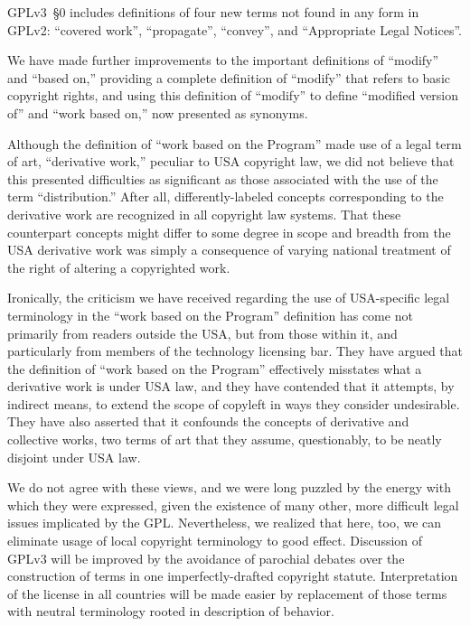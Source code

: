 
GPLv3~\S0 includes definitions of four new terms not found in any form in
GPLv2: ``covered work'', ``propagate'', ``convey'', and ``Appropriate Legal
Notices''.


We have made further improvements to the important definitions of ``modify''
and ``based on,'' providing a complete definition of ``modify'' that refers
to basic copyright rights, and using this definition of ``modify'' to define
``modified version of'' and ``work based on,'' now presented as synonyms.


Although the definition of ``work based on the Program'' made use of a legal
term of art, ``derivative work,'' peculiar to USA copyright law, we did not
believe that this presented difficulties as significant as those associated
with the use of the term ``distribution.''  After all, differently-labeled
concepts corresponding to the derivative work are recognized in all copyright
law systems.  That these counterpart concepts might differ to some degree in
scope and breadth from the USA derivative work was simply a consequence of
varying national treatment of the right of altering a copyrighted work.


Ironically, the criticism we have received regarding the use of
USA-specific legal terminology in the ``work based on the Program''
definition has come not primarily from readers outside the USA, but
from those within it, and particularly from members of the technology
licensing bar.  They have argued that the definition of ``work based
on the Program'' effectively misstates what a derivative work is under
USA law, and they have contended that it attempts, by indirect means,
to extend the scope of copyleft in ways they consider undesirable.
They have also asserted that it confounds the concepts of derivative
and collective works, two terms of art that they assume, questionably,
to be neatly disjoint under USA law.


We do not agree with these views, and we were long puzzled by the
energy with which they were expressed, given the existence of many
other, more difficult legal issues implicated by the GPL.
Nevertheless, we realized that here, too, we can eliminate usage of
local copyright terminology to good effect.  Discussion of GPLv3 will
be improved by the avoidance of parochial debates over the
construction of terms in one imperfectly-drafted copyright statute.
Interpretation of the license in all countries will be made easier by
replacement of those terms with neutral terminology rooted in
description of behavior.


